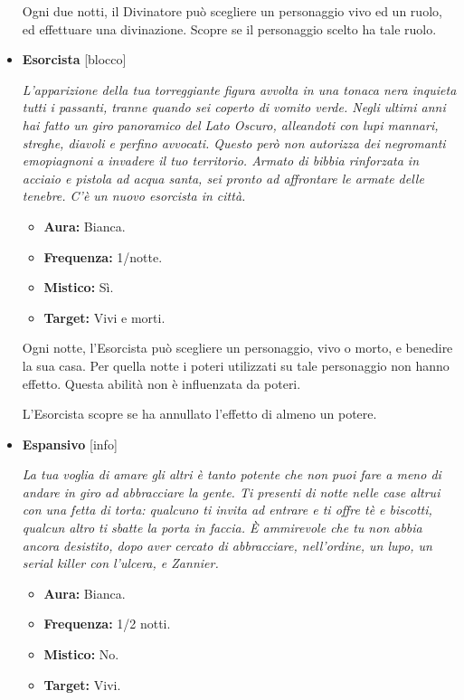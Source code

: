 \documentclass[a4paper,10pt]{article}
\begin{document}
\begin{itemize}
            Ogni due notti, il Divinatore può scegliere un personaggio vivo ed un ruolo, ed effettuare una divinazione. Scopre se il personaggio scelto ha tale ruolo.

      \item \textbf{Esorcista} [blocco]

            \emph{L'apparizione della tua torreggiante figura avvolta in una tonaca nera inquieta tutti i passanti, tranne quando sei coperto di vomito verde. Negli ultimi anni hai fatto un giro panoramico del Lato Oscuro, alleandoti con lupi mannari, streghe, diavoli e perfino avvocati. Questo però non autorizza dei negromanti emopiagnoni a invadere il tuo territorio. Armato di bibbia rinforzata in acciaio e pistola ad acqua santa, sei pronto ad affrontare le armate delle tenebre. C'è un nuovo esorcista in città.}

            \begin{multicols}{2}
                  \begin{itemize}
                        \item \textbf{Aura:} Bianca.
                        \item \textbf{Frequenza:} 1/notte.
                        \item \textbf{Mistico:} Sì.
                        \item \textbf{Target:} Vivi e morti.
                  \end{itemize}
            \end{multicols}

            Ogni notte, l'Esorcista può scegliere un personaggio, vivo o morto, e benedire la sua casa. Per quella notte i poteri utilizzati su tale personaggio non hanno effetto. Questa abilità non è influenzata da poteri.

            L'Esorcista scopre se ha annullato l'effetto di almeno un potere.

      \item \textbf{Espansivo} [info]

            \emph{La tua voglia di amare gli altri è tanto potente che non puoi fare a meno di andare in giro ad abbracciare la gente. Ti presenti di notte nelle case altrui con una fetta di torta: qualcuno ti invita ad entrare e ti offre tè e biscotti, qualcun altro ti sbatte la porta in faccia. È ammirevole che tu non abbia ancora desistito, dopo aver cercato di abbracciare, nell'ordine, un lupo, un serial killer con l'ulcera, e Zannier.}

            \begin{multicols}{2}
                  \begin{itemize}
                        \item \textbf{Aura:} Bianca.
                        \item \textbf{Frequenza:} 1/2 notti.
                        \item \textbf{Mistico:} No.
                        \item \textbf{Target:} Vivi.
                  \end{itemize}
            \end{multicols}


\end{itemize}
\end{document}
